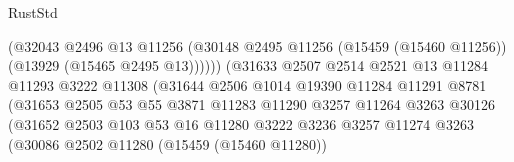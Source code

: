 \begin{lexlean}{RustStd}
\begin{coremodule}
                                          (@32043
                                            @2496
                                            @13
                                            @11256
                                            (@30148
                                              @2495
                                              @11256
                                              (@15459 (@15460 @11256))
                                              (@13929 (@15465 @2495 @13))))))
                                      (@31633
                                        @2507
                                        @2514
                                        @2521
                                        @13
                                        @11284
                                        @11293
                                        @3222
                                        @11308
                                        (@31644
                                          @2506
                                          @1014
                                          @19390
                                          @11284
                                          @11291
                                          @8781
                                          (@31653
                                            @2505
                                            @53
                                            @55
                                            @3871
                                            @11283
                                            @11290
                                            @3257
                                            @11264
                                            @3263
                                            @30126
                                            (@31652
                                              @2503
                                              @103
                                              @53
                                              @16
                                              @11280
                                              @3222
                                              @3236
                                              @3257
                                              @11274
                                              @3263
                                              (@30086
                                                @2502
                                                @11280
                                                (@15459 (@15460 @11280))

\end{coremodule}
\end{lexlean}
